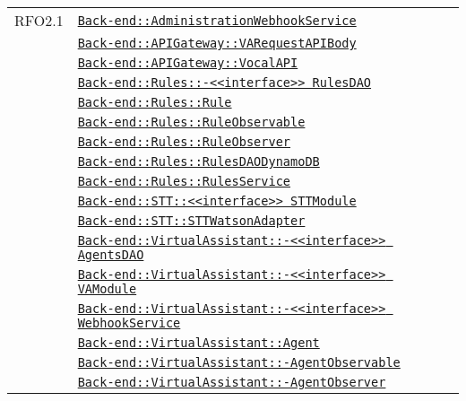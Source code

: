 \begin{longtable}{|>{\centering}m{3cm}|m{10cm}<{\centering}|}
RFO2.1 & \hyperref[Back-end::AdministrationWebhookService]{\texttt{Back-end::AdministrationWebhookService}}\\
& \hyperref[Back-end::APIGateway::VARequestAPIBody]{\texttt{Back-end::APIGateway::VARequestAPIBody}}\\
& \hyperref[Back-end::APIGateway::VocalAPI]{\texttt{Back-end::APIGateway::VocalAPI}}\\
& \hyperref[Back-end::Rules::<<interface>> RulesDAO]{\texttt{Back-end::Rules::-\linebreak <<interface>> RulesDAO}}\\
& \hyperref[Back-end::Rules::Rule]{\texttt{Back-end::Rules::Rule}}\\
& \hyperref[Back-end::Rules::RuleObservable]{\texttt{Back-end::Rules::RuleObservable}}\\
& \hyperref[Back-end::Rules::RuleObserver]{\texttt{Back-end::Rules::RuleObserver}}\\
& \hyperref[Back-end::Rules::RulesDAODynamoDB]{\texttt{Back-end::Rules::RulesDAODynamoDB}}\\
& \hyperref[Back-end::Rules::RulesService]{\texttt{Back-end::Rules::RulesService}}\\
& \hyperref[Back-end::STT::<<interface>> STTModule]{\texttt{Back-end::STT::<<interface>> STTModule}}\\
& \hyperref[Back-end::STT::STTWatsonAdapter]{\texttt{Back-end::STT::STTWatsonAdapter}}\\
& \hyperref[Back-end::VirtualAssistant::<<interface>> AgentsDAO]{\texttt{Back-end::VirtualAssistant::-\linebreak <<interface>> AgentsDAO}}\\
& \hyperref[Back-end::VirtualAssistant::<<interface>> VAModule]{\texttt{Back-end::VirtualAssistant::-\linebreak <<interface>> VAModule}}\\
& \hyperref[Back-end::VirtualAssistant::<<interface>> WebhookService]{\texttt{Back-end::VirtualAssistant::-\linebreak <<interface>> WebhookService}}\\
& \hyperref[Back-end::VirtualAssistant::Agent]{\texttt{Back-end::VirtualAssistant::Agent}}\\
& \hyperref[Back-end::VirtualAssistant::AgentObservable]{\texttt{Back-end::VirtualAssistant::-\linebreak AgentObservable}}\\
& \hyperref[Back-end::VirtualAssistant::AgentObserver]{\texttt{Back-end::VirtualAssistant::-\linebreak AgentObserver}}\\

\end{longtable}
